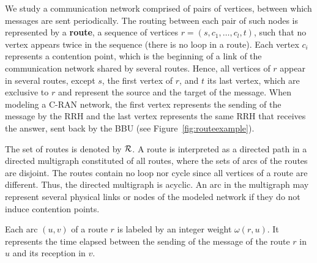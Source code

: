 \documentclass[a4paper,10pt]{journal}
\begin{document}
  	We study a communication network comprised of pairs of vertices, between which messages are sent periodically. The routing between each pair of such nodes is represented by a \textbf{route}, a sequence of vertices $r=(s, c_1, \ldots, c_l, t)$, such that no vertex appears twice in the sequence (there is no loop in a route). Each vertex $c_i$ represents a contention point, which is the beginning of a link of the communication network shared by several routes. Hence, all vertices of $r$ appear in several routes, except $s$, the first vertex of $r$, and $t$ its last vertex, which are exclusive to $r$ and represent the source and the target of the message. When modeling a C-RAN network, the first vertex represents the sending of the message by the RRH and the last vertex represents the same RRH that receives the answer, sent back by the BBU (see Figure~\ref{fig:routeexample}).

  	The set of routes is denoted by ${\cal R}$. A route is interpreted as a directed path in a directed multigraph constituted of all routes, where the sets of arcs of the routes are disjoint. The routes contain no loop nor cycle since all vertices of a route are different. Thus, the directed multigraph is acyclic. An arc in the multigraph may represent several physical links or nodes of the modeled network if they do not induce contention points. 


  	Each arc $(u,v)$ of a route $r$ is labeled by an integer weight $\omega(r,u)$. It represents the time elapsed between the sending of the message of the route $r$ in $u$ and its reception in $v$.
\end{document}
